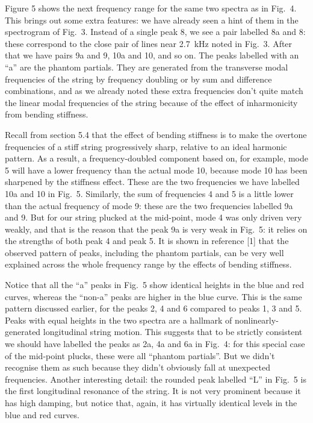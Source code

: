   Figure 5 shows the next frequency range for the same two spectra as in Fig.\ 
  4. This brings out some extra features: we have already seen a hint of them 
  in the spectrogram of Fig.\ 3. Instead of a single peak 8, we see a pair 
  labelled 8a and 8: these correspond to the close pair of lines near 2.7~kHz 
  noted in Fig.\ 3. After that we have pairs 9a and 9, 10a and 10, and so on. 
  The peaks labelled with an ``a'' are the phantom partials. They are generated 
  from the transverse modal frequencies of the string by frequency doubling or 
  by sum and difference combinations, and as we already noted these extra 
  frequencies don't quite match the linear modal frequencies of the string 
  because of the effect of inharmonicity from bending stiffness. 

  Recall from section 5.4 that the effect of bending stiffness is to make the 
  overtone frequencies of a stiff string progressively sharp, relative to an 
  ideal harmonic pattern. As a result, a frequency-doubled component based on, 
  for example, mode 5 will have a lower frequency than the actual mode 10, 
  because mode 10 has been sharpened by the stiffness effect. These are the two 
  frequencies we have labelled 10a and 10 in Fig.\ 5. Similarly, the sum of 
  frequencies 4 and 5 is a little lower than the actual frequency of mode 9: 
  these are the two frequencies labelled 9a and 9. But for our string plucked 
  at the mid-point, mode 4 was only driven very weakly, and that is the reason 
  that the peak 9a is very weak in Fig.\ 5: it relies on the strengths of both 
  peak 4 and peak 5. It is shown in reference [1] that the observed pattern of 
  peaks, including the phantom partials, can be very well explained across the 
  whole frequency range by the effects of bending stiffness. 

  Notice that all the ``a'' peaks in Fig.\ 5 show identical heights in the blue 
  and red curves, whereas the ``non-a'' peaks are higher in the blue curve. 
  This is the same pattern discussed earlier, for the peaks 2, 4 and 6 compared 
  to peaks 1, 3 and 5. Peaks with equal heights in the two spectra are a 
  hallmark of nonlinearly-generated longitudinal string motion. This suggests 
  that to be strictly consistent we should have labelled the peaks as 2a, 4a 
  and 6a in Fig.\ 4: for this special case of the mid-point plucks, these were 
  all ``phantom partials''. But we didn't recognise them as such because they 
  didn't obviously fall at unexpected frequencies. Another interesting detail: 
  the rounded peak labelled ``L'' in Fig.\ 5 is the first longitudinal 
  resonance of the string. It is not very prominent because it has high 
  damping, but notice that, again, it has virtually identical levels in the 
  blue and red curves. 

